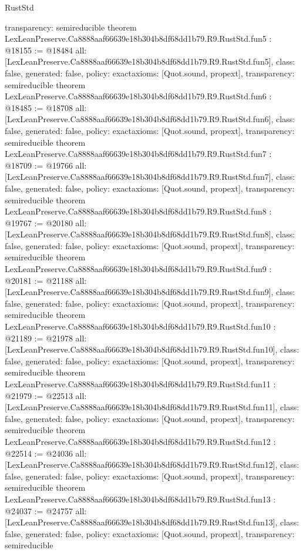 \begin{lexlean}{RustStd}
\begin{coremodule}
{  transparency: semireducible
}
theorem LexLeanPreserve.Ca8888aaf66639e18b304b8df68dd1b79.R9.RustStd.fun5 : @18155 := @18484 {
  all: [LexLeanPreserve.Ca8888aaf66639e18b304b8df68dd1b79.R9.RustStd.fun5],
  class: false,
  generated: false,
  policy: exact{axioms: [Quot.sound, propext]},
  transparency: semireducible
}
theorem LexLeanPreserve.Ca8888aaf66639e18b304b8df68dd1b79.R9.RustStd.fun6 : @18485 := @18708 {
  all: [LexLeanPreserve.Ca8888aaf66639e18b304b8df68dd1b79.R9.RustStd.fun6],
  class: false,
  generated: false,
  policy: exact{axioms: [Quot.sound, propext]},
  transparency: semireducible
}
theorem LexLeanPreserve.Ca8888aaf66639e18b304b8df68dd1b79.R9.RustStd.fun7 : @18709 := @19766 {
  all: [LexLeanPreserve.Ca8888aaf66639e18b304b8df68dd1b79.R9.RustStd.fun7],
  class: false,
  generated: false,
  policy: exact{axioms: [Quot.sound, propext]},
  transparency: semireducible
}
theorem LexLeanPreserve.Ca8888aaf66639e18b304b8df68dd1b79.R9.RustStd.fun8 : @19767 := @20180 {
  all: [LexLeanPreserve.Ca8888aaf66639e18b304b8df68dd1b79.R9.RustStd.fun8],
  class: false,
  generated: false,
  policy: exact{axioms: [Quot.sound, propext]},
  transparency: semireducible
}
theorem LexLeanPreserve.Ca8888aaf66639e18b304b8df68dd1b79.R9.RustStd.fun9 : @20181 := @21188 {
  all: [LexLeanPreserve.Ca8888aaf66639e18b304b8df68dd1b79.R9.RustStd.fun9],
  class: false,
  generated: false,
  policy: exact{axioms: [Quot.sound, propext]},
  transparency: semireducible
}
theorem LexLeanPreserve.Ca8888aaf66639e18b304b8df68dd1b79.R9.RustStd.fun10 : @21189 := @21978 {
  all: [LexLeanPreserve.Ca8888aaf66639e18b304b8df68dd1b79.R9.RustStd.fun10],
  class: false,
  generated: false,
  policy: exact{axioms: [Quot.sound, propext]},
  transparency: semireducible
}
theorem LexLeanPreserve.Ca8888aaf66639e18b304b8df68dd1b79.R9.RustStd.fun11 : @21979 := @22513 {
  all: [LexLeanPreserve.Ca8888aaf66639e18b304b8df68dd1b79.R9.RustStd.fun11],
  class: false,
  generated: false,
  policy: exact{axioms: [Quot.sound, propext]},
  transparency: semireducible
}
theorem LexLeanPreserve.Ca8888aaf66639e18b304b8df68dd1b79.R9.RustStd.fun12 : @22514 := @24036 {
  all: [LexLeanPreserve.Ca8888aaf66639e18b304b8df68dd1b79.R9.RustStd.fun12],
  class: false,
  generated: false,
  policy: exact{axioms: [Quot.sound, propext]},
  transparency: semireducible
}
theorem LexLeanPreserve.Ca8888aaf66639e18b304b8df68dd1b79.R9.RustStd.fun13 : @24037 := @24757 {
  all: [LexLeanPreserve.Ca8888aaf66639e18b304b8df68dd1b79.R9.RustStd.fun13],
  class: false,
  generated: false,
  policy: exact{axioms: [Quot.sound, propext]},
  transparency: semireducible
}
\end{coremodule}
\end{lexlean}
